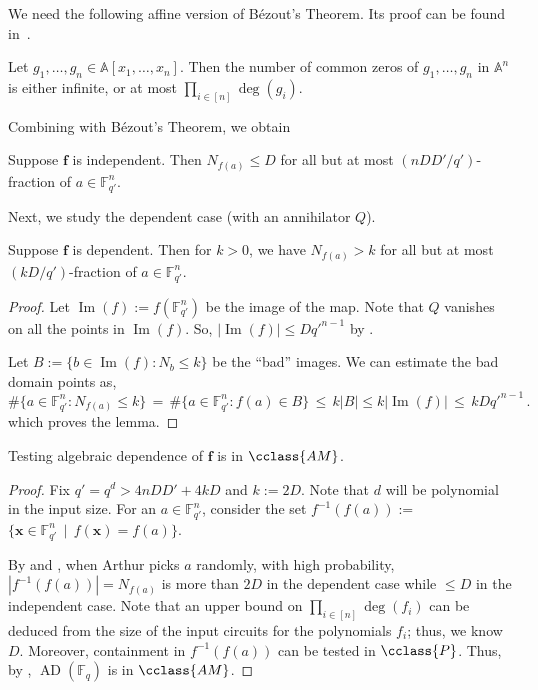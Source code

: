 \documentclass{toc}
\newcommand{\F}{\mathbb{F}}
\newcommand{\aff}{\mathbb{A}}
\DeclareMathOperator{\im}{\mathrm{Im}}
\newcommand{\Pclass}{\cclass{P}\xspace}  %
\newcommand{\AM}{\cclass{AM}\xspace}  %
\DeclareMathOperator{\AD}{\mathrm{AD}\xspace} %
\begin{document}
We need the following affine version of B\'ezout's Theorem. Its proof can be found in~\cite[Theorem~3.1]{Sch95}.
\begin{theorem}[B\'ezout's]
 Let $g_1,\dots,g_n\in \aff[x_1,\dots,x_n]$. Then the number of common zeros of $g_1,\dots,g_n$ in $\aff^n$ is either infinite, or at most $\prod_{i\in[n]} \deg(g_i)$.
\end{theorem}

Combining  with B\'ezout's Theorem, we obtain
\begin{lemma}\label{lem_bpre}
Suppose $\mathbf f$
%
is  %
independent.
Then $N_{f(a)}\leq D$ for all but at most $(nDD'/q')$-fraction of $a\in\F_{q'}^n$.
\end{lemma}

Next, we study the dependent case (with an annihilator $Q$).

\begin{lemma}\label{lem_coamdep}
Suppose $\mathbf f$
%
is  %
dependent.
Then for $k>0$, we have $N_{f(a)}>k$ for all but at most $(kD/q')$-fraction of $a\in \F_{q'}^n$.
\end{lemma}
\begin{proof}
 Let $\im(f):= f(\F_{q'}^n)$ be the image of the map. Note that $Q$ vanishes on all the points in $\im(f)$. So, $|\im(f)| \leq Dq'^{n-1}$ by 
 . %
 
Let $B:= \{b\in \im(f): N_b\leq k\}$ be the ``bad'' images. We can estimate the bad domain points as, 
\[
\#\{a\in \F_{q'}^n: N_{f(a)}\leq k\} \,=\, \#\{a\in \F_{q'}^n: f(a)\in B\} \,\le\,  k|B| \le k|\im(f)| \,\le\, k D q'^{n-1} \,.
\]
which proves the lemma.
\end{proof}


\begin{theorem}[$\AM$]\label{thm_am}
Testing algebraic dependence of $\mathbf f$ is in $\AM$.
\end{theorem}
\begin{proof}
Fix $q'=q^d>4nDD'+4kD$ and $k:=2D$. Note that $d$ will be polynomial in the input size.
For an $a\in \F_{q'}^n$, consider the set 
$f^{-1}(f(a)) :=$ $\{\mathbf x \in \F_{q'}^n \,\mid\, f(\mathbf x) = f(a) \}$.

%
By  and , when %
Arthur picks $a$ randomly, with high probability, $|f^{-1}(f(a))|= N_{f(a)}$ is more than $2D$ in the dependent case while $\le D$ in the independent case. Note that an upper bound on $\prod_{i\in [n]}\deg(f_i)$ can be deduced from the size of the input circuits for 
%
the polynomials $f_i$; %
thus, we know $D$. Moreover, containment in $f^{-1}(f(a))$ can be tested in 
%
$\Pclass$. %
Thus, by ,
%
$\AD(\F_q)$    %
is in $\AM$.
\end{proof}
\end{document}
